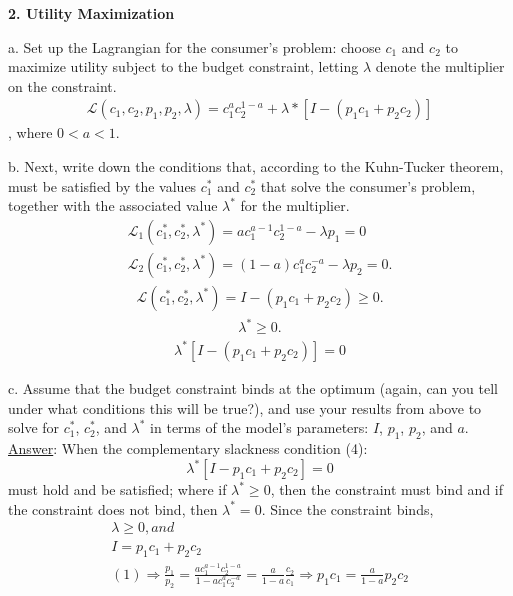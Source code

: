 \documentclass[12pt]{article}
\begin{document}
\pagebreak{}
{\bfseries 2. Utility Maximization}
\begin{description}
\item a. Set up the Lagrangian for the consumer's problem: choose $c_{1}$ and $c_{2}$ to maximize utility subject to the budget constraint, letting $\lambda$ denote the multiplier on the constraint.
\begin{gather*}
\mathcal{L}(c_1,c_2,p_1,p_2,\lambda) = c_{1}^{a}c_{2}^{1-a} + \lambda*[I - (p_{1}c_{1}+p_{2}c_{2})]
\end{gather*}
, where $0<a<1$.
\item b. Next, write down the conditions that, according to the Kuhn-Tucker theorem, must be satisfied by the values $c_{1}^{*}$ and $c_{2}^{*}$ that solve the consumer's problem, together with the associated value $\lambda^{*}$ for the multiplier.
\begin{align*}
    \mathcal{L}_{1}(c_1^*,c_2^*, \lambda^*) = ac_1^{a-1}c_2^{1-a} - \lambda p_1 = 0 \\
    \mathcal{L}_{2}(c_1^*, c_2^*, \lambda^*) = (1-a)c_1^{a}c_2^{-a} - \lambda p_2 = 0 .  \tag{1}
\end{align*}
\begin{align*}
    \mathcal{L}(c_1^*, c_2^*, \lambda^*) = I - (p_1c_1+p_2c_2) \geq 0 .  \tag{2}
\end{align*}
\begin{align*}
    \lambda^* \geq 0 . \tag{3}
\end{align*}
\begin{align*}
    \lambda^*[I - (p_1c_1+p_2c_2)] = 0  \tag{4}
\end{align*}
\item c. Assume that the budget constraint binds at the optimum (again, can you tell under what conditions this will be true?), and use your results from above to solve for $c_{1}^{*}$, $c_{2}^{*}$, and $\lambda^{*}$ in terms of the model's parameters: $I$, $p_{1}$, $p_{2}$, and $a$.
\newline
\underline{Answer}: When the complementary slackness condition (4): 
\[\lambda^*[I - p_1c_1+p_2c_2] = 0 \] must hold and be satisfied; where if $\lambda^* \geq 0$, then the constraint must bind and if the constraint does not bind, then $\lambda^* = 0$. Since the constraint binds,
\begin{gather*}
    \lambda \geq 0, and \\ I = p_1c_1 + p_2c_2 
    \\
    (1) \Rightarrow \frac{p_1}{p_2} = \frac{ac_1^{a-1}c_2^{1-a}}{{1-a}c_1^ac_2^{-a}} = \frac{a}{1-a}\frac{c_2}{c_1} \Rightarrow p_1c_1 = \frac{a}{1-a}p_2c_2

\end{gather*}
\end{description}
\end{document}

